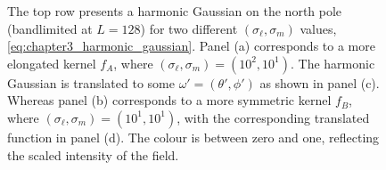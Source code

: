 \begin{figure}[htpb]
\caption[
Two harmonic Gaussians on the north pole and then translated
]{
The top row presents a harmonic Gaussian on the north pole (bandlimited at \(L=128\)) for two different \((\sigma_{\ell},\sigma_{m})\) values, \cf{} \cref{eq:chapter3_harmonic_gaussian}.
Panel (a) corresponds to a more elongated kernel \(f_{A}\), where \((\sigma_{\ell},\sigma_{m}) = (10^{2},10^{1})\).
The harmonic Gaussian is translated to some \(\omega'=(\theta',\phi')\) as shown in panel (c).
Whereas panel (b) corresponds to a more symmetric kernel \(f_{B}\), where \((\sigma_{\ell},\sigma_{m}) = (10^{1},10^{1})\), with the corresponding translated function in panel (d).
The colour is between zero and one, reflecting the scaled intensity of the field.
}\label{fig:chapter3_harmonic_gaussian}
\end{figure}
